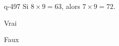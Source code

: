 \begin{truefalse}{q-497}
Si $8\times 9 = 63$, alors $7\times 9 = 72$.
\item* Vrai
\item Faux
\end{truefalse}

